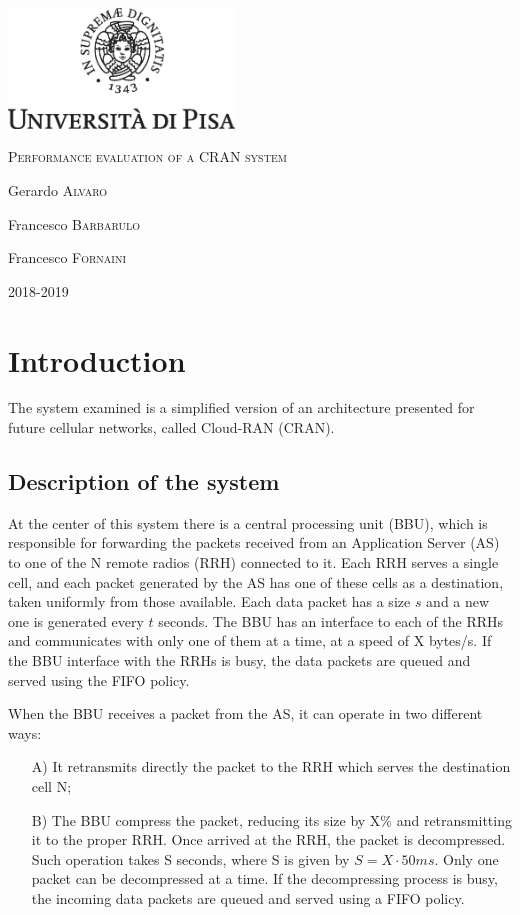\documentclass[11pt,a4paper,oneside, openright]{article}
\begin{document}
{
  \begin{titlepage}
  	\centering
  	\includegraphics[width=6cm]{images/unipi.eps}\par
  	\vspace{1.5cm}
  	{\huge\textsc{Performance evaluation of a CRAN system}\par}
  	\vspace{2cm}
  	Gerardo \textsc{Alvaro}\par
  	Francesco \textsc{Barbarulo}\par
    Francesco \textsc{Fornaini}

  	\vfill

  	{\large 2018-2019\par}
  \end{titlepage}
}


\tableofcontents

\newpage

\section{Introduction}
The system examined is a simplified version of an architecture presented for future cellular networks, called Cloud-RAN (CRAN).

\subsection{Description of the system}
 At the center of this system there is a central processing unit (BBU), which is responsible for forwarding the packets received from an Application Server (AS) to one of the N remote radios (RRH) connected to it. Each RRH serves a single cell, and each packet generated by the AS has one of these cells as a destination, taken uniformly from those available. Each data packet has a size $s$ and a new one is generated every $t$ seconds. The BBU has an interface to each of the RRHs and communicates with only one of them at a time, at a speed of X bytes/s. If the BBU interface with the RRHs is busy, the data packets are queued and served using the FIFO policy.

When the BBU receives a packet from the AS, it can operate in two different ways:
\begin{itemize}
	\item[A)]It retransmits directly the packet to the RRH which serves the destination cell N;
	\item[B)]The BBU compress the packet, reducing its size by X\% and retransmitting it to the proper RRH. Once arrived at the RRH, the packet is decompressed. Such operation takes S seconds, where S is given by $ S = X \cdot 50ms $. Only one packet can be decompressed at a time. If the decompressing process is busy, the incoming data packets are queued and served using a FIFO policy.
\end{itemize}
\end{document}
